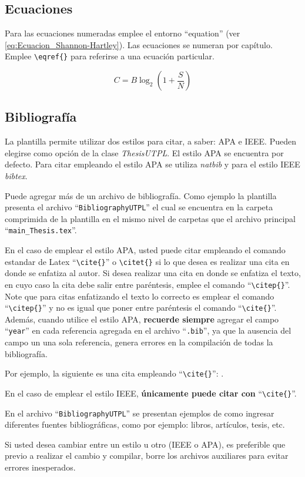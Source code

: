 \subsection{Ecuaciones}
Para las ecuaciones numeradas emplee el entorno ``equation'' (ver \eqref{eq:Ecuacion_Shannon-Hartley}). Las ecuaciones se numeran por capítulo. Emplee  \lstinline|\eqref{}| para referirse a una ecuación particular.  

\begin{equation}\label{eq:Ecuacion_Shannon-Hartley}
C = B \log_{2} \left( 1 + \frac{S}{N} \right) 
\end{equation}


\subsection{Bibliografía}
\label{sec:Bibliografia}
La plantilla permite utilizar dos estilos para citar, a saber: APA e IEEE. Pueden elegirse como opción de la clase \textit{ThesisUTPL}. El estilo APA se encuentra por defecto. Para citar empleando el estilo APA se utiliza \textit{natbib} y para el estilo IEEE \textit{bibtex}. 

Puede agregar más de un archivo de bibliografía. Como ejemplo la plantilla presenta el archivo ``\lstinline|BibliographyUTPL|'' el cual se encuentra en la carpeta comprimida de la plantilla en el mismo nivel de carpetas que el archivo principal ``\lstinline|main_Thesis.tex|''. 
 
En el caso de emplear el estilo APA, usted puede citar empleando el comando estandar de Latex ``\lstinline|\cite{}|'' o \lstinline|\citet{}| si lo que desea es realizar una cita en donde se enfatiza al autor. Si desea realizar una cita en donde se enfatiza el texto, en cuyo caso la cita debe salir entre paréntesis, emplee el comando ``\lstinline|\citep{}|''. Note que para citas enfatizando el texto lo correcto es emplear el comando ``\lstinline|\citep{}|'' y no es igual que poner entre paréntesis el comando ``\lstinline|\cite{}|''. Además, cuando utilice el estilo APA, \textbf{recuerde siempre} agregar el campo ``\lstinline|year|'' en cada referencia agregada en el archivo ``\lstinline|.bib|'', ya que la ausencia del campo un una sola referencia, genera errores en la compilación de todas la bibliografía. 

Por ejemplo, la siguiente es una cita empleando ``\lstinline|\cite{}|'': \cite{sandoval2017hybrid}. 

En el caso de emplear el estilo IEEE, \textbf{únicamente puede citar con} ``\lstinline|\cite{}|''. 

En el archivo ``\lstinline|BibliographyUTPL|'' se presentan ejemplos de como ingresar diferentes fuentes bibliográficas, como por ejemplo: libros, artículos, tesis, etc. 

Si usted desea cambiar entre un estilo u otro (IEEE o APA), es preferible que previo a realizar el cambio y compilar, borre los archivos auxiliares para evitar errores inesperados. 
